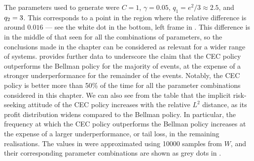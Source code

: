 \documentclass[main.tex]{subfiles}
\begin{document}
The parameters used to generate 
were $C=1$, $\gamma=0.05$, $q_1=e^2/3\approx2.5$, and
$q_2=\nobreak3$. This corresponds to a point
in the region where the relative difference is around $0.016$ --- see the
white dot in the
bottom, left frame in .
This difference is in the middle of that seen for all the
combinations of parameters, so the conclusions made in the chapter
can be considered as relevant for a wider range of systems.
 provides further data to underscore
the claim that the CEC policy
outperforms the Bellman policy for the
majority of events, at the expense of a stronger underperformance
for the remainder of the events. Notably, the CEC policy is better
more than 50\% of the time for all the parameter
combinations considered in this chapter.
We can also see from the table that the implicit risk-seeking attitude
of the CEC policy increases with
the relative $L^2$ distance, as its profit distribution widens compared to
the Bellman policy.
In particular, the frequency at which the CEC policy
outperforms the Bellman policy increases at the expense of a larger
underperformance, or tail loss, in the remaining realisations.
The values in  were approximated using \num{10000} samples
from $W$, and their corresponding parameter combinations are shown as
grey dots in .
\end{document}
